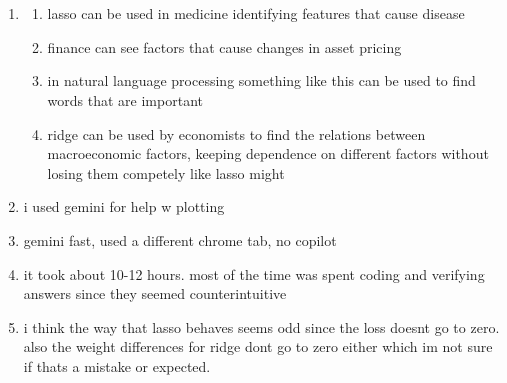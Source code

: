 \documentclass{article}
\begin{document}
\section{}
\begin{enumerate}
    \item \begin{enumerate}
        \item lasso can be used in medicine identifying features that cause disease
        \item finance can see factors that cause changes in asset pricing
        \item in natural language processing something like this can be used to find words that are important
        \item ridge can be used by economists to find the relations between macroeconomic factors, keeping dependence on different factors without losing them competely like lasso might
    \end{enumerate}
    \item i used gemini for help w plotting
    \item gemini fast, used a different chrome tab, no copilot
    \item it took about 10-12 hours. most of the time was spent coding and verifying answers since they seemed counterintuitive
    \item i think the way that lasso behaves seems odd since the loss doesnt go to zero. also the weight differences for ridge dont go to zero either which im not sure if thats a mistake or expected. 
\end{enumerate}
\end{document}
